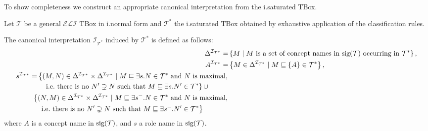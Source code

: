 To show completeness we construct an appropriate canonical interpretation from the i.saturated TBox.
\begin{definition}
	Let $\mathcal{T}$ be a general $\mathcal{ELI}$ TBox in i.normal form and $\mathcal{T}^*$ the i.saturated TBox
	obtained by exhaustive application of the classification rules.

	The canonical interpretation $\mathcal{I}_{\mathcal{T}^*}$ induced by $\mathcal{T}^*$ is defined as follows:
	\begin{align*}
		\Delta^{\mathcal{I}_{\mathcal{T}^*}} =& \left\{ M \mid M \text{ is a set of concept names in $\func{sig}(\mathcal{T})$ occurring in $\mathcal{T}^*$} \right\},\\
		A^{\mathcal{I}_{\mathcal{T}^*}} =& \left\{ M \in \Delta^{\mathcal{I}_{\mathcal{T}^*}} \mid M \sqsubseteq \left\{ A \right\} \in \mathcal{T}^* \right\},\\
		\begin{split}
		s^{\mathcal{I}_{\mathcal{T}^*}} =& \left\{ (M,N) \in \Delta^{\mathcal{I}_{\mathcal{T}^*}} \times \Delta^{\mathcal{I}_{\mathcal{T}^*}} \mid M \sqsubseteq \exists s.N \in \mathcal{T}^* \text{ and $N$ is maximal,} \right. \\
										&\quad\left. \text{i.e.\ there is no } N' \supsetneq N \text{ such that } M \sqsubseteq \exists s.N' \in \mathcal{T}^* \right\} \cup
		\end{split}\\
		\begin{split}
		& \left\{ (N,M) \in \Delta^{\mathcal{I}_{\mathcal{T}^*}} \times \Delta^{\mathcal{I}_{\mathcal{T}^*}} \mid M \sqsubseteq \exists s^-.N \in \mathcal{T}^* \text{ and $N$ is maximal,} \right. \\
										&\quad\left. \text{i.e.\ there is no } N' \supsetneq N \text{ such that } M \sqsubseteq \exists s^-.N' \in \mathcal{T}^* \right\}
		\end{split}
	\end{align*}
	where $A$ is a concept name in $\operatorname{\text{sig}}(\mathcal{T})$, and $s$ a role name in $\operatorname{\text{sig}}(\mathcal{T})$.
\end{definition}

